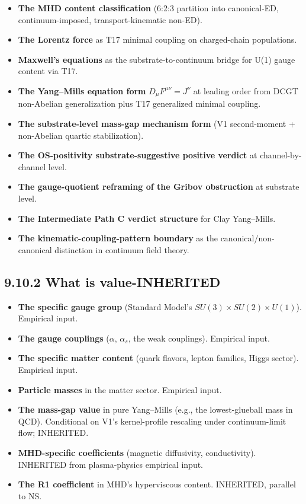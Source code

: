 \documentclass[11pt]{book}
\begin{document}
\begin{itemize}
\item \textbf{The MHD content classification} (6:2:3 partition into canonical-ED, continuum-imposed, transport-kinematic non-ED).
\item \textbf{The Lorentz force} as T17 minimal coupling on charged-chain populations.
\item \textbf{Maxwell's equations} as the substrate-to-continuum bridge for U(1) gauge content via T17.
\item \textbf{The Yang–Mills equation form} $D_\mu F^{\mu\nu} = J^\nu$ at leading order from DCGT non-Abelian generalization plus T17 generalized minimal coupling.
\item \textbf{The substrate-level mass-gap mechanism form} (V1 second-moment + non-Abelian quartic stabilization).
\item \textbf{The OS-positivity substrate-suggestive positive verdict} at channel-by-channel level.
\item \textbf{The gauge-quotient reframing of the Gribov obstruction} at substrate level.
\item \textbf{The Intermediate Path C verdict structure} for Clay Yang–Mills.
\item \textbf{The kinematic-coupling-pattern boundary} as the canonical/non-canonical distinction in continuum field theory.
\end{itemize}

\subsection{9.10.2 What is value-INHERITED}

\begin{itemize}
\item \textbf{The specific gauge group} (Standard Model's $SU(3) \times SU(2) \times U(1)$). Empirical input.
\item \textbf{The gauge couplings} ($\alpha$, $\alpha_s$, the weak couplings). Empirical input.
\item \textbf{The specific matter content} (quark flavors, lepton families, Higgs sector). Empirical input.
\item \textbf{Particle masses} in the matter sector. Empirical input.
\item \textbf{The mass-gap value} in pure Yang–Mills (e.g., the lowest-glueball mass in QCD). Conditional on V1's kernel-profile rescaling under continuum-limit flow; INHERITED.
\item \textbf{MHD-specific coefficients} (magnetic diffusivity, conductivity). INHERITED from plasma-physics empirical input.
\item \textbf{The R1 coefficient} in MHD's hyperviscous content. INHERITED, parallel to NS.
\end{itemize}
\end{document}
